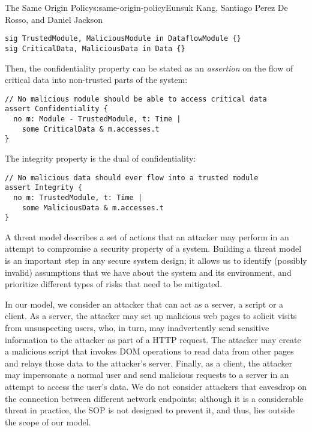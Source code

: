 \begin{aosachapter}{The Same Origin Policy}{s:same-origin-policy}{Eunsuk Kang, Santiago Perez De Rosso, and Daniel Jackson}
\begin{verbatim}
sig TrustedModule, MaliciousModule in DataflowModule {}
sig CriticalData, MaliciousData in Data {}
\end{verbatim}

Then, the confidentiality property can be stated as an \emph{assertion}
on the flow of critical data into non-trusted parts of the system:

\begin{verbatim}
// No malicious module should be able to access critical data
assert Confidentiality {
  no m: Module - TrustedModule, t: Time |
    some CriticalData & m.accesses.t 
}
\end{verbatim}

The integrity property is the dual of confidentiality:

\begin{verbatim}
// No malicious data should ever flow into a trusted module
assert Integrity {
  no m: TrustedModule, t: Time | 
    some MaliciousData & m.accesses.t
}
\end{verbatim}

\label{threat-model}

A threat model describes a set of actions that an attacker may perform
in an attempt to compromise a security property of a system. Building a
threat model is an important step in any secure system design; it allows
us to identify (possibly invalid) assumptions that we have about the
system and its environment, and prioritize different types of risks that
need to be mitigated.

In our model, we consider an attacker that can act as a server, a script
or a client. As a server, the attacker may set up malicious web pages to
solicit visits from unsuspecting users, who, in turn, may inadvertently
send sensitive information to the attacker as part of a HTTP request.
The attacker may create a malicious script that invokes DOM operations
to read data from other pages and relays those data to the attacker's
server. Finally, as a client, the attacker may impersonate a normal user
and send malicious requests to a server in an attempt to access the
user's data. We do not consider attackers that eavesdrop on the
connection between different network endpoints; although it is a
considerable threat in practice, the SOP is not designed to prevent it,
and thus, lies outside the scope of our model.

\label{checking-properties}


\end{aosachapter}
